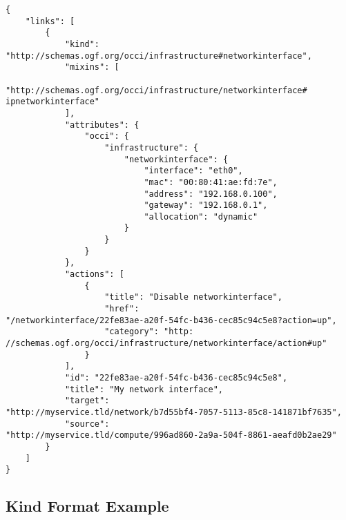 \documentclass[10pt,a4paper]{article}
\begin{document}
\begin{verbatim}
{
    "links": [
        {
            "kind":
"http://schemas.ogf.org/occi/infrastructure#networkinterface",
            "mixins": [
                "http://schemas.ogf.org/occi/infrastructure/networkinterface#
ipnetworkinterface"
            ],
            "attributes": {
                "occi": {
                    "infrastructure": {
                        "networkinterface": {
                            "interface": "eth0",
                            "mac": "00:80:41:ae:fd:7e",
                            "address": "192.168.0.100",
                            "gateway": "192.168.0.1",
                            "allocation": "dynamic"
                        }
                    }
                }
            },
            "actions": [
                {
                    "title": "Disable networkinterface",
                    "href":
"/networkinterface/22fe83ae-a20f-54fc-b436-cec85c94c5e8?action=up",
                    "category": "http:
//schemas.ogf.org/occi/infrastructure/networkinterface/action#up"
                }
            ],
            "id": "22fe83ae-a20f-54fc-b436-cec85c94c5e8",
		    "title": "My network interface",
            "target":
"http://myservice.tld/network/b7d55bf4-7057-5113-85c8-141871bf7635",
            "source":
"http://myservice.tld/compute/996ad860-2a9a-504f-8861-aeafd0b2ae29"
        }
    ]
}
\end{verbatim}

\subsection{Kind Format Example}
\label{sec:example_kind}
\end{document}
